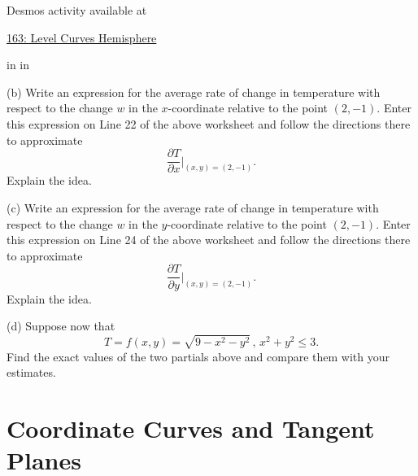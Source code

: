 \documentclass{ximera}
\newcommand{\pskip}{\vskip 0.1 in}
\begin{document}
\begin{example}
Desmos activity available at

\href{https://www.desmos.com/calculator/mrbwyydrcm}{163: Level Curves Hemisphere}

\pskip \pskip


(b) Write an expression for the average rate of change in temperature with respect to the change $w$ in the $x$-coordinate relative to the point $(2,-1)$. Enter this expression on Line 22 of the above worksheet and follow the directions there to approximate 
\[
   \frac{\partial T}{\partial x}\Big|_{(x,y)=(2,-1)} .
\]
Explain the idea.

(c) Write an expression for the average rate of change in temperature with respect to the change $w$ in the $y$-coordinate relative to the point $(2,-1)$. Enter this expression on Line 24 of the above worksheet and follow the directions there to approximate 
\[
   \frac{\partial T}{\partial y}\Big|_{(x,y)=(2,-1)} .
\]
Explain the idea.

(d) Suppose now that 
\[
    T = f(x,y) = \sqrt{9-x^2-y^2} \, , \, x^2 + y^2 \leq 3 .
\]
Find the exact values of the two partials above and compare them with your estimates.

\end{example}

\section{Coordinate Curves and Tangent Planes}
\end{document}

